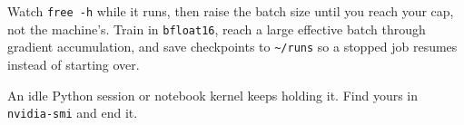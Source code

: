  Watch \mbox{\texttt{free -h}} while it runs,
then raise the batch size until you reach your cap, not the machine's.
Train in \texttt{bfloat16}, reach a large effective batch through gradient
accumulation, and save checkpoints to \texttt{\textasciitilde/runs} so a
stopped job resumes instead of starting over.

 An idle Python
session or notebook kernel keeps holding it. Find yours in
\texttt{nvidia-smi} and end it.
